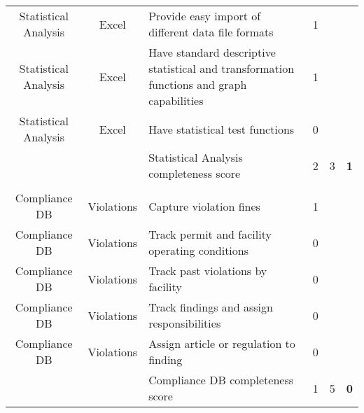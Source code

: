 \begin{table}[H]
{\begin{tabular}{@{}cclccc@{}}
Statistical Analysis & Excel & Provide easy import of different data file formats & 1 &  &  \\
Statistical Analysis & Excel & Have standard descriptive statistical and transformation functions and graph capabilities & 1 &  &  \\
Statistical Analysis & Excel & Have statistical test functions & 0 &  &  \\
 &  & Statistical Analysis completeness score & 2 & 3 & \textbf{1} \\
 &  &  &  &  &  \\
Compliance DB & Violations & Capture violation fines & 1 &  &  \\
Compliance DB & Violations & Track permit and facility operating conditions & 0 &  &  \\
Compliance DB & Violations & Track past violations by facility & 0 &  &  \\
Compliance DB & Violations & Track findings and assign responsibilities & 0 &  &  \\
Compliance DB & Violations & Assign article or regulation to finding & 0 &  &  \\
 &  & Compliance DB completeness score & 1 & 5 & \textbf{0} \\ \bottomrule
\end{tabular}
}%
\end{table}